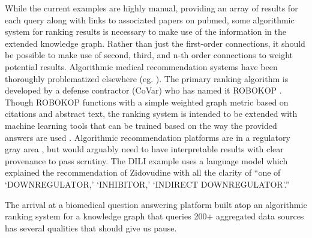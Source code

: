 While the current examples are highly manual, providing an array of
results for each query along with links to associated papers on pubmed,
some algorithmic system for ranking results is necessary to make use of
the information in the extended knowledge graph. Rather than just the
first-order connections, it should be possible to make use of second,
third, and n-th order connections to weight potential results.
Algorithmic medical recommendation systems have been thoroughly
problematized elsewhere (eg. \citep{groteEthicsAlgorithmicDecisionmaking2020, obermeyerDissectingRacialBias2019, panchArtificialIntelligenceAlgorithmic2019, panchInconvenientTruthAI2019} ). The primary ranking algorithm is developed by a defense
contractor (CoVar) who has named it
ROBOKOP \citep{mortonROBOKOPAbstractionLayer2019} . Though ROBOKOP functions with a
simple weighted graph metric based on citations and abstract text, the
ranking system is intended to be extended with machine learning tools
\citep{mortonROBOKOPAbstractionLayer2019}  that can be trained
based on the way the provided answers are used \citep{consortiumUniversalBiomedicalData2019} . Algorithmic recommendation
platforms are in a regulatory gray area \citep{ordishAlgorithmsMedicalDevices2019, el-sayedMedicalAlgorithmsNeed2021} , but would arguably need to have interpretable results with clear
provenance to pass scrutiny. The DILI example uses a language model
which explained the recommendation of Zidovudine with all the clarity of
``one of `DOWNREGULATOR,' `INHIBITOR,' `INDIRECT DOWNREGULATOR'.''

The arrival at a biomedical question answering platform built atop an
algorithmic ranking system for a knowledge graph that queries 200+
aggregated data sources has several qualities that should give us pause.

